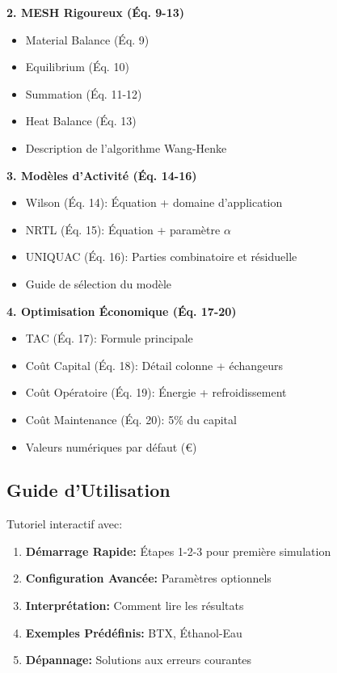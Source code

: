 \documentclass[11pt,a4paper]{article}
\begin{document}
\textbf{2. MESH Rigoureux (Éq. 9-13)}

\begin{itemize}[leftmargin=*]
    \item Material Balance (Éq. 9)
    \item Equilibrium (Éq. 10)
    \item Summation (Éq. 11-12)
    \item Heat Balance (Éq. 13)
    \item Description de l'algorithme Wang-Henke
\end{itemize}

\textbf{3. Modèles d'Activité (Éq. 14-16)}

\begin{itemize}[leftmargin=*]
    \item Wilson (Éq. 14): Équation + domaine d'application
    \item NRTL (Éq. 15): Équation + paramètre $\alpha$
    \item UNIQUAC (Éq. 16): Parties combinatoire et résiduelle
    \item Guide de sélection du modèle
\end{itemize}

\textbf{4. Optimisation Économique (Éq. 17-20)}

\begin{itemize}[leftmargin=*]
    \item TAC (Éq. 17): Formule principale
    \item Coût Capital (Éq. 18): Détail colonne + échangeurs
    \item Coût Opératoire (Éq. 19): Énergie + refroidissement
    \item Coût Maintenance (Éq. 20): 5\% du capital
    \item Valeurs numériques par défaut (€)
\end{itemize}

\subsection{Guide d'Utilisation}

Tutoriel interactif avec:

\begin{enumerate}[leftmargin=*]
    \item \textbf{Démarrage Rapide:} Étapes 1-2-3 pour première simulation
    \item \textbf{Configuration Avancée:} Paramètres optionnels
    \item \textbf{Interprétation:} Comment lire les résultats
    \item \textbf{Exemples Prédéfinis:} BTX, Éthanol-Eau
    \item \textbf{Dépannage:} Solutions aux erreurs courantes
\end{enumerate}
\end{document}
